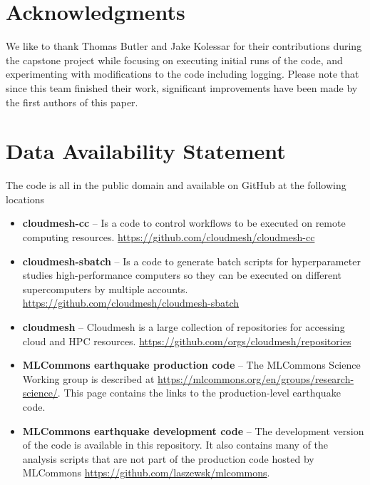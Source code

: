 \documentclass[utf8]{FrontiersinVancouver} %
\begin{document}
\section*{Acknowledgments}

We like to thank Thomas Butler and Jake Kolessar for their
contributions during the capstone project while focusing on executing
initial runs of the code, and experimenting with modifications to the
code including logging. Please note that since this team finished
their work, significant improvements have been made by the first authors of
this paper.



\section*{Data Availability Statement}

The code is all in the public domain and available on GitHub at the following locations

\begin{itemize}

\item {\bf cloudmesh-cc} -- Is a code to control workflows to be executed on
  remote computing
  resources. \url{https://github.com/cloudmesh/cloudmesh-cc}

\item {\bf cloudmesh-sbatch} -- Is a code to generate batch scripts for
  hyperparameter studies high-performance computers so they can be
  executed on different supercomputers by multiple
  accounts. \url{https://github.com/cloudmesh/cloudmesh-sbatch}

\item {\bf cloudmesh} -- Cloudmesh is a large collection of repositories for
  accessing cloud and HPC
  resources. \url{https://github.com/orgs/cloudmesh/repositories}

\item {\bf MLCommons earthquake production code} -- The MLCommons Science
  Working group is described at
  \url{https://mlcommons.org/en/groups/research-science/}. This page
  contains the links to the production-level earthquake code.

\item {\bf MLCommons earthquake development code} -- The development version of
  the code is available in this repository. It also contains many of
  the analysis scripts that are not part of the production code
  hosted by MLCommons \url{https://github.com/laszewsk/mlcommons}.

\end{itemize}


% 



\end{document}
